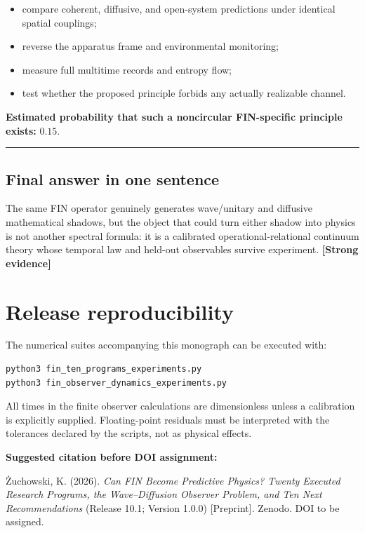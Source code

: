 \documentclass[11pt,a4paper,openany]{report}
\newcommand{\statusStrong}{\textcolor{finblue}{[Strong evidence]}}
\begin{document}
\begin{itemize}
\item 
compare coherent, diffusive, and open-system predictions under identical spatial couplings;

\item 
reverse the apparatus frame and environmental monitoring;

\item 
measure full multitime records and entropy flow;

\item 
test whether the proposed principle forbids any actually realizable channel.

\end{itemize}

\textbf{Estimated probability that such a noncircular FIN-specific principle exists:} \(0.15\).

\par\medskip\hrule\medskip

\section{Final answer in one sentence}

The same FIN operator genuinely generates wave/\allowbreak{}unitary and diffusive mathematical shadows, but the object that could turn either shadow into physics is not another spectral formula: it is a calibrated operational-relational continuum theory whose temporal law and held-out observables survive experiment. \textbf{\statusStrong{}}


\clearpage
\chapter*{Release reproducibility}
The numerical suites accompanying this monograph can be executed with:
\begin{Verbatim}[fontsize=\small]
python3 fin_ten_programs_experiments.py
python3 fin_observer_dynamics_experiments.py
\end{Verbatim}
All times in the finite observer calculations are dimensionless unless a calibration is explicitly supplied. Floating-point residuals must be interpreted with the tolerances declared by the scripts, not as physical effects.

\medskip
\noindent\textbf{Suggested citation before DOI assignment:}

Żuchowski, K. (2026). \emph{Can FIN Become Predictive Physics? Twenty Executed Research Programs, the Wave--Diffusion Observer Problem, and Ten Next Recommendations} (Release 10.1; Version 1.0.0) [Preprint]. Zenodo. DOI to be assigned.
\end{document}
